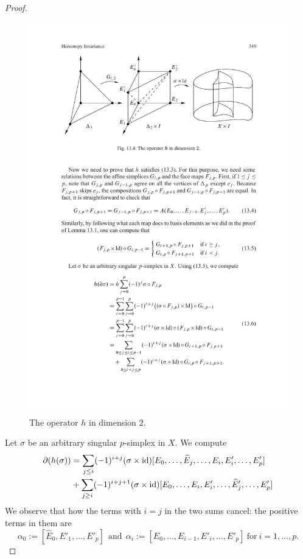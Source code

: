 \begin{proof}
\begin{figure}[htbp]
\includegraphics{pictures/chain-homotopy}
\caption{The operator $h$ in dimension $2$.}
\end{figure}
Let $\sigma$ be an arbitrary singular $p$-simplex in $X$. We compute
\begin{align*}
\partial(h(\sigma))&=\sum_{j\leq i}(-1)^{i+j}(\sigma\times\mathrm{id})[E_0,\dots,\widehat{E}_j,\dots,E_i,E'_i,\dots,E'_p]\\
&+\sum_{j\geq i}(-1)^{i+j+1}(\sigma\times\mathrm{id})[E_0,\dots,E_i,E'_i,\dots,\widehat{E}'_j,\dots,E'_p]
\end{align*}
We observe that how the terms with $i=j$ in the two sums cancel: the positive terms in them are
\[\alpha_0:=[\widehat{E}_0,E'_1,\dots,E'_p]\ \ \text{and}\ \  \alpha_i:=[E_0,\dots,E_{i-1},E'_{i},\dots,E'_p]\ \text{for}\ i=1,\dots,p.\]

\end{proof}

